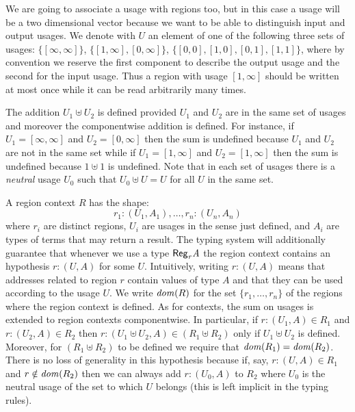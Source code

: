 \documentclass[11pt]{article}
\newcommand{\hyp}[3]{#1:(#2, #3)}
\newcommand{\csum}{\uplus}              \newcommand{\dpar}{\mid\!\mid}
\newcommand{\set}[1]{\{#1\}}
\newcommand{\rgtype}[2]{{\it {\sf Reg}_{#1} #2}}
\newcommand{\upair}[2]{[#1,#2]}
\begin{document}
We are going to associate a usage with regions too, but in this case a usage
will be a two dimensional vector because we want to be able to distinguish
input and output usages. We denote with $U$ an element of one of the following
three sets of usages:
$\set{\upair{\infty}{\infty}}$,
$\set{\upair{1}{\infty},\upair{0}{\infty}}$,
$\set{\upair{0}{0},\upair{1}{0},\upair{0}{1},\upair{1}{1}}$,
where by convention we reserve the first component to describe the
output usage and the second for the input usage. Thus a region with usage
$\upair{1}{\infty}$ should be written at most once while it can be 
read arbitrarily many times. 

The addition $U_1\csum U_2$ is defined provided $U_1$ and $U_2$ are in the same set of usages and 
moreover the componentwise addition is defined. 
For instance, if $U_1=\upair{\infty}{\infty}$ and $U_2=\upair{0}{\infty}$ then the sum is undefined
because $U_1$ and $U_2$ are not in the same set while if $U_1=\upair{1}{\infty}$ and
$U_2=\upair{1}{\infty}$ then the sum is undefined because $1\csum 1$ is undefined.
Note that in each set of usages there is
a {\em neutral} usage $U_0$ such that $U_0\csum U=U$ for all $U$ in the same set.

A region context $R$ has the shape:
\begin{equation}
\hyp{r_{1}}{U_{1}}{A_{1}},\ldots,\hyp{r_{n}}{U_{n}}{A_{n}}
\end{equation}
where $r_i$ are distinct regions, $U_i$ are usages in the sense just defined, 
and $A_i$ are types of terms that may return a result. 
The typing system will additionally guarantee that whenever we use a type 
$\rgtype{r}{A}$ the region context  contains 
an hypothesis $\hyp{r}{U}{A}$ for some $U$.
Intuitively, writing $\hyp{r}{U}{A}$ means that addresses related to region
$r$ contain values of type $A$ and that they 
can be used according to the usage $U$.
We  write ${\it dom}(R)$ for the set $\set{r_1,\ldots,r_n}$ of the regions
where the region context is defined.
As for contexts, the sum on usages is extended to region contexts
componentwise.
In particular,  if $r:(U_1,A)\in R_1$ and $r:(U_2,A)\in R_2$ then
$r:(U_1\csum U_2,A)\in (R_1\csum R_2)$ only if 
$U_1\csum U_2$ is defined. 
Moreover, for $(R_1\csum R_2)$ to be defined we require that ${\it dom}(R_1)={\it dom}(R_2)$.
There is no loss of generality in this hypothesis because if, say, 
$\hyp{r}{U}{A}\in R_1$ and $r\notin{\it dom}(R_2)$ then we can always add 
$\hyp{r}{U_{0}}{A}$ to $R_2$ where $U_0$ is the neutral usage of the set to which
$U$ belongs (this is left implicit in the typing rules).
\end{document}
